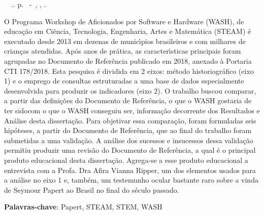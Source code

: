 \setlength{\absparsep}{18pt} %
\begin{resumo}
\begin{flushleft} 
\setlength{\absparsep}{0pt} %
\SingleSpacing 
\imprimirautorabr~~\textbf{\imprimirtituloresumo}.\imprimirdata. \pageref{LastPage}p. 
\imprimirtipotrabalho~-~\imprimirinstituicao, \imprimirlocal, \imprimirdata. 
 \end{flushleft}
\OnehalfSpacing 
O  Programa Workshop de Aficionados por Software e Hardware (WASH), de educa\c{c}\~ao em Ci\^encia, Tecnologia, Engenharia, Artes e Matem\'atica (STEAM) \'e executado desde 2013 em dezenas de munic\'{\i}pios brasileiros e com milhares de crian\c{c}as atendidas. Ap\'os anos de pr\'atica, as caracter\'{\i}sticas principais foram agrupadas no Documento de Refer\^encia publicado em 2018, anexado \`a Portaria CTI 178/2018. Esta pesquisa \'e dividida em 2 eixos: m\'etodo historiogr\'afico (eixo 1) e o emprego de consultas estruturadas a uma base de dados especialmente desenvolvida para produzir os indicadores (eixo 2). O trabalho buscou comparar, a partir das defini\c{c}\~oes do Documento de Refer\^encia, \textquotedbl o que o WASH gostaria de ter sido\textquotedbl  com \textquotedbl o que o WASH conseguiu ser\textquotedbl , informa\c{c}\~ao decorrente dos Resultados e An\'alise desta disserta\c{c}\~ao. Para objetivar essa compara\c{c}\~ao, foram formuladas seis hip\'oteses, a partir do Documento de Refer\^encia, que ao final do trabalho foram submetidas a uma valida\c{c}\~ao.  A an\'alise dos sucessos e insucessos dessa valida\c{c}\~ao permitiu produzir uma revis\~ao do Documento de Refer\^encia, a qual \'e o principal produto educacional desta disserta\c{c}\~ao. Agrega-se a esse produto educacional a entrevista com a Profa. Dra Afira Vianna Ripper, um dos elementos usados para a an\'alise no eixo 1 e, tamb\'em, um testemunho ocular bastante raro sobre a vinda de Seymour Papert ao Brasil no final do s\'eculo passado.
 

 \textbf{Palavras-chave}: Papert, STEAM, STEM, WASH
\end{resumo}